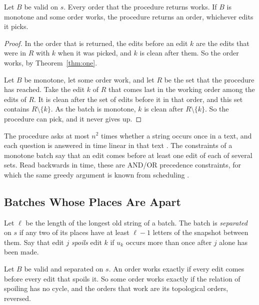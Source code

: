\documentclass[acmsmall,nonacm,screen]{acmart}
\begin{document}
\begin{theorem}\label{thm:end}
Let $B$ be valid on $s$. Every order that the procedure returns works. If $B$ is monotone and
some order works, the procedure returns an order, whichever edits it picks.
\end{theorem}

\begin{proof}
In the order that is returned, the edits before an edit $k$ are the edits that were in $R$
with $k$ when it was picked, and $k$ is clean after them. So the order works, by
Theorem~\ref{thm:one}.

Let $B$ be monotone, let some order work, and let $R$ be the set that the procedure has
reached. Take the edit $k$ of $R$ that comes last in the working order among the edits of
$R$. It is clean after the set of edits before it in that order, and this set contains $R
\setminus \{k\}$. As the batch is monotone, $k$ is clean after $R \setminus \{k\}$. So the
procedure can pick, and it never gives up.
\end{proof}

The procedure asks at most $n^2$ times whether a string occurs once in a text, and each
question is answered in time linear in that text \citep{KMP1977}. The constraints of a
monotone batch say that an edit comes before at least one edit of each of several sets.
Read backwards in time, these are AND/OR precedence constraints, for which the same greedy
argument is known from scheduling \citep{Mohring2004}.

\subsection{Batches Whose Places Are Apart}

Let $\ell$ be the length of the longest old string of a batch. The batch is \emph{separated}
on $s$ if any two of its places have at least $\ell - 1$ letters of the snapshot between
them. Say that edit $j$ \emph{spoils} edit $k$ if $u_k$ occurs more than once after $j$ alone
has been made.

\begin{theorem}\label{thm:separated}
Let $B$ be valid and separated on $s$. An order works exactly if every edit comes before every
edit that spoils it. So some order works exactly if the relation of spoiling has no cycle,
and the orders that work are its topological orders, reversed.
\end{theorem}
\end{document}
